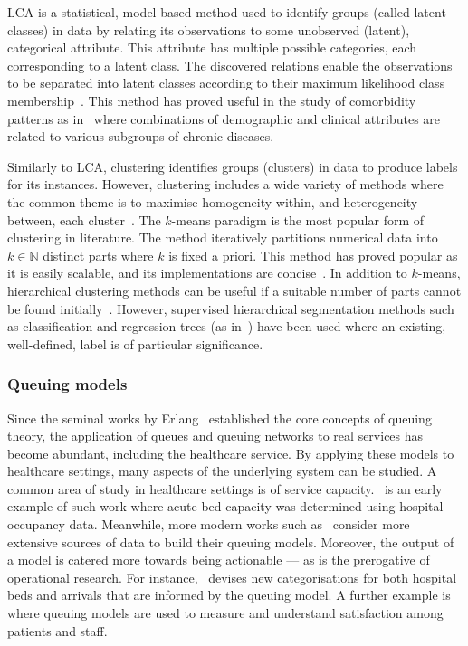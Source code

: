 LCA is a statistical, model-based method used to identify groups (called latent
classes) in data by relating its observations to some unobserved (latent),
categorical attribute. This attribute has multiple possible categories, each
corresponding to a latent class. The discovered relations enable the
observations to be separated into latent classes according to their maximum
likelihood class membership~\cite{Hagenaars2002,Lazarsfeld1968}. This method has
proved useful in the study of comorbidity patterns as
in~\cite{Kuwornu2014,Larsen2017} where combinations of demographic and clinical
attributes are related to various subgroups of chronic diseases.

Similarly to LCA, clustering identifies groups (clusters) in data to produce
labels for its instances. However, clustering includes a wide variety of methods
where the common theme is to maximise homogeneity within, and heterogeneity
between, each cluster~\cite{Everitt2011}. The \(k\)-means paradigm is the most
popular form of clustering in literature. The method iteratively partitions
numerical data into \(k \in \mathbb N\) distinct parts where \(k\) is fixed a
priori. This method has proved popular as it is easily scalable, and its
implementations are concise~\cite{Olafsson2008,Wu2009}. In addition to
\(k\)-means, hierarchical clustering methods can be useful if a suitable number
of parts cannot be found initially~\cite{Vuik2016a}. However, supervised
hierarchical segmentation methods such as classification and regression trees
(as in~\cite{Harper2006}) have been used where an existing, well-defined, label
is of particular significance.

\subsubsection{Queuing models}

Since the seminal works by Erlang~\cite{Erlang1917,Erlang1920} established the
core concepts of queuing theory, the application of queues and queuing networks
to real services has become abundant, including the healthcare service. By
applying these models to healthcare settings, many aspects of the underlying
system can be studied. A common area of study in healthcare settings is of
service capacity.~\cite{McClain1976} is an early example of such work where
acute bed capacity was determined using hospital occupancy data. Meanwhile, more
modern works such as~\cite{Palvannan2012,Pinto2014} consider more extensive
sources of data to build their queuing models.  Moreover, the output of a model
is catered more towards being actionable --- as is the prerogative of
operational research. For instance,~\cite{Pinto2014} devises new categorisations
for both hospital beds and arrivals that are informed by the queuing model. A
further example is~\cite{Komashie2015} where queuing models are used to measure
and understand satisfaction among patients and staff.

